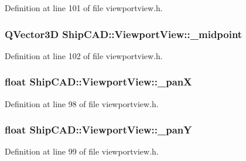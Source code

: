 Definition at line 101 of file viewportview.\-h.

\hypertarget{classShipCAD_1_1ViewportView_af4017af3ac64751ce2c5f348d2567657}{
\subsubsection[{\-\_\-midpoint}]{\setlength{\rightskip}{0pt plus 5cm}Q\-Vector3\-D Ship\-C\-A\-D\-::\-Viewport\-View\-::\-\_\-midpoint\hspace{0.3cm}{\ttfamily [protected]}}}\label{classShipCAD_1_1ViewportView_af4017af3ac64751ce2c5f348d2567657}


Definition at line 102 of file viewportview.\-h.

\hypertarget{classShipCAD_1_1ViewportView_a3cccfb1058f0c8f66d662c1f19ed5c33}{
\subsubsection[{\-\_\-pan\-X}]{\setlength{\rightskip}{0pt plus 5cm}float Ship\-C\-A\-D\-::\-Viewport\-View\-::\-\_\-pan\-X\hspace{0.3cm}{\ttfamily [protected]}}}\label{classShipCAD_1_1ViewportView_a3cccfb1058f0c8f66d662c1f19ed5c33}


Definition at line 98 of file viewportview.\-h.

\hypertarget{classShipCAD_1_1ViewportView_aa2a8062a009ea1a9f26498a103134d3f}{
\subsubsection[{\-\_\-pan\-Y}]{\setlength{\rightskip}{0pt plus 5cm}float Ship\-C\-A\-D\-::\-Viewport\-View\-::\-\_\-pan\-Y\hspace{0.3cm}{\ttfamily [protected]}}}\label{classShipCAD_1_1ViewportView_aa2a8062a009ea1a9f26498a103134d3f}


Definition at line 99 of file viewportview.\-h.

